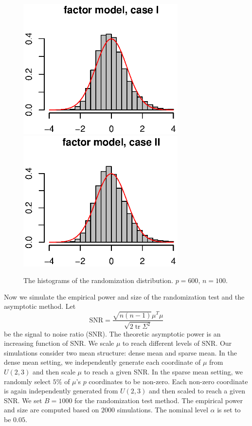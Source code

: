 \documentclass[smallcondensed,final,natbib]{svjour3}          %
\DeclareMathOperator{\mytr}{tr}
\begin{document}
\begin{figure}[htbp]
    \includegraphics[width=84mm]{Fig6}
    \includegraphics[width=84mm]{Fig7}\\
    \caption{The histograms of the randomization distribution. $p=600$, $n=100$.}\label{figure:histogram}
\end{figure}




Now we simulate the empirical power and size of the randomization test and the asymptotic method.
Let 
\begin{equation*}
    \mathrm{SNR}=\frac{\sqrt{n(n-1)}\mu^T \mu}{\sqrt{2\mytr \Sigma^2}}
\end{equation*}
be the signal to noise ratio (SNR).
The theoretic asymptotic power is an increasing function of SNR\@.
We scale $\mu$ to reach different levels of SNR\@.
Our simulations consider two mean structure: dense mean and sparse mean.
In the dense mean setting,  we independently generate each coordinate of $\mu$ from $U(2,3)$ and then scale $\mu$ to reach a given SNR\@.
In the sparse mean setting, we randomly select $5\%$ of $\mu$'s $p$ coordinates to be non-zero.
Each non-zero coordinate is again independently generated from $U(2,3)$ and then scaled to reach a given SNR\@.
We set $B=1000$ for the randomization test method.
The empirical power and size are computed based on $2000$ simulations.
The nominal level $\alpha$ is set to be $0.05$.
\end{document}
